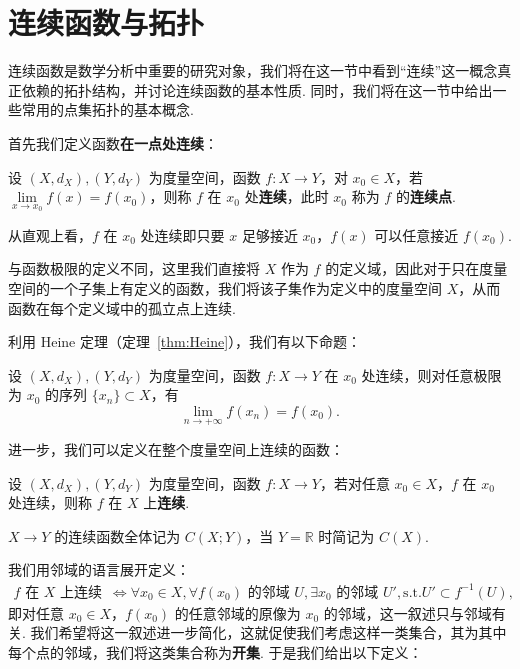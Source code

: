 \documentclass[../main.tex]{subfiles}
\begin{document}
\section{连续函数与拓扑}

连续函数是数学分析中重要的研究对象，我们将在这一节中看到“连续”这一概念真正依赖的拓扑结构，并讨论连续函数的基本性质. 同时，我们将在这一节中给出一些常用的点集拓扑的基本概念. 

首先我们定义函数\textbf{在一点处连续}：

\begin{definition}[函数在一点处连续的定义]
    设 $(X, d_X), (Y, d_Y)$ 为度量空间，函数 $f:X \to Y$，对 $x_0 \in X$，若 $\lim\limits_{x \to x_0} f(x) = f(x_0)$，则称 $f$ 在 $x_0$ 处\textbf{连续}，此时 $x_0$ 称为 $f$ 的\textbf{连续点}. 
\end{definition}

\begin{remark}
    从直观上看，$f$ 在 $x_0$ 处连续即只要 $x$ 足够接近 $x_0$，$f(x)$ 可以任意接近 $f(x_0)$. 

    与函数极限的定义不同，这里我们直接将 $X$ 作为 $f$ 的定义域，因此对于只在度量空间的一个子集上有定义的函数，我们将该子集作为定义中的度量空间 $X$，从而函数在每个定义域中的孤立点上连续. 
\end{remark}

利用 Heine 定理（定理~\ref{thm:Heine}），我们有以下命题：

\begin{proposition}[极限与连续的可交换性] \label{prop:cont-swap-lim}
    设 $(X, d_X), (Y, d_Y)$ 为度量空间，函数 $f:X \to Y$ 在 $x_0$ 处连续，则对任意极限为 $x_0$ 的序列 $\{x_n\} \subset X$，有
    $$
    \lim\limits_{n \to +\infty} f(x_n) = f(x_0). 
    $$
\end{proposition}

进一步，我们可以定义在整个度量空间上连续的函数：

\begin{definition}[度量空间上的连续函数的定义]
    设 $(X, d_X), (Y, d_Y)$ 为度量空间，函数 $f:X \to Y$，若对任意 $x_0 \in X$，$f$ 在 $x_0$ 处连续，则称 $f$ 在 $X$ 上\textbf{连续}. 
    
    $X \to Y$ 的连续函数全体记为 $C(X;Y)$，当 $Y = \mathbb R$ 时简记为 $C(X)$. 
\end{definition}

我们用邻域的语言展开定义：
\begin{align*}
    \text{$f$ 在 $X$ 上连续} &\Longleftrightarrow \forall x_0 \in X, \forall \text{$f(x_0)$ 的邻域 $U$}, \exists \text{$x_0$ 的邻域 $U'$}, \text{s.t.} U' \subset f^{-1}(U), 
\end{align*}
即对任意 $x_0 \in X$，$f(x_0)$ 的任意邻域的原像为 $x_0$ 的邻域，这一叙述只与邻域有关. 我们希望将这一叙述进一步简化，这就促使我们考虑这样一类集合，其为其中每个点的邻域，我们将这类集合称为\textbf{开集}. 于是我们给出以下定义：
\end{document}
